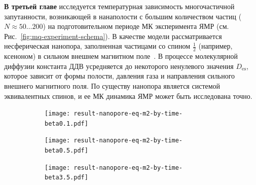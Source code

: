 \textbf{В третьей главе} исследуется температурная зависимость многочастичной запутанности,
возникающей в нанаполости с большим количеством частиц (\(N\approx50\dots200\)) на подготовительном периоде МК эксперимента ЯМР (см. Рис.~\ref{fig:mq-experiment-schema}).
В качестве модели рассматривается несферическая нанопора, заполненная частицами со спином $\frac 1 2$ (например, ксеноном) в сильном внешнем магнитном поле~\cite{Baugh2001}.
В процессе молекулярной диффузии константа ДДВ усредняется до некоторого ненулевого значения $D_\mathrm{es}$,
которое зависит от формы полости, давления газа и направления сильного внешнего магнитного поля.
По существу нанопора является системой эквивалентных спинов,
и ее МК динамика ЯМР может быть исследована точно.


\begin{figure}[h]
  \centering
  \begin{subfigure}[t]{0.31\textwidth}
    \centering
    \texttt{[image: result-nanopore-eq-m2-by-time-beta0.1.pdf]}
    \caption{\protect}
    \label{fig:result-nanopore-eq-m2-by-time-beta0.1}
  \end{subfigure}
  \hfill
  \begin{subfigure}[t]{0.32\textwidth}
    \centering
    \texttt{[image: result-nanopore-eq-m2-by-time-beta0.5.pdf]}
    \caption{\protect}
    \label{fig:result-nanopore-eq-m2-by-time-beta0.5}
  \end{subfigure}
  \hfill
  \begin{subfigure}[t]{0.34\textwidth}
    \centering
    \texttt{[image: result-nanopore-eq-m2-by-time-beta3.5.pdf]}
    \caption{\protect}
    \label{fig:result-nanopore-eq-m2-by-time-beta3.5}
  \end{subfigure}
  \caption{\protect}
  \label{fig:result-nanopore-eq-m2-by-time-betas}
\end{figure}

